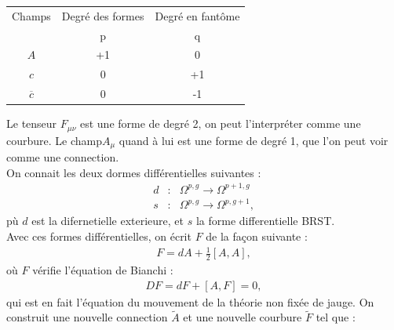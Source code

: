 \documentclass[a4paper,11pt]{article} %
\theoremstyle{plain}
\theoremstyle{definition}
\theoremstyle{remark}
\numberwithin{equation}{section}
\numberwithin{equation}{subsection}
\numberwithin{figure}{section}
\begin{document}
\begin{center}
\begin{tabular}{|c|c|c|}
\hline
 Champs & Degré des formes & Degré en fantôme \\
     & p & q \\
\hline
\hline
 $A$ & +1 & 0 \\
\hline
 $c$ & 0 & +1 \\
\hline
 $\overline{c}$ & 0 & -1 \\
\hline
\end{tabular}
\end{center}

Le tenseur $F_{\mu \nu}$ est une forme de degré 2, on peut l'interpréter comme une courbure. Le champ$A_{\mu}$ quand à lui est une forme 
de degré 1, que l'on peut voir comme une connection.\\
On connait les deux dormes différentielles suivantes :
\begin{eqnarray*}
 d &:& \Omega^{p,g} \rightarrow \Omega^{p+1,g}\\
 s &:& \Omega^{p,g} \rightarrow \Omega^{p,g+1} ,
\end{eqnarray*}
pù $d$ est la difernetielle exterieure, et $s$ la forme differentielle BRST.\\
Avec ces formes différentielles, on écrit $F$ de la façon suivante :
\begin{eqnarray*}
 F = dA + \frac{1}{2} [A,A] ,
\end{eqnarray*}
où $F$ vérifie l'équation de Bianchi :
\begin{eqnarray*}
 DF = dF + [A,F] = 0 ,
\end{eqnarray*}
qui est en fait l'équation du mouvement de la théorie non fixée de jauge.
On construit une nouvelle connection $\tilde{A}$ et une nouvelle courbure $\tilde{F}$ tel que :
\end{document}

